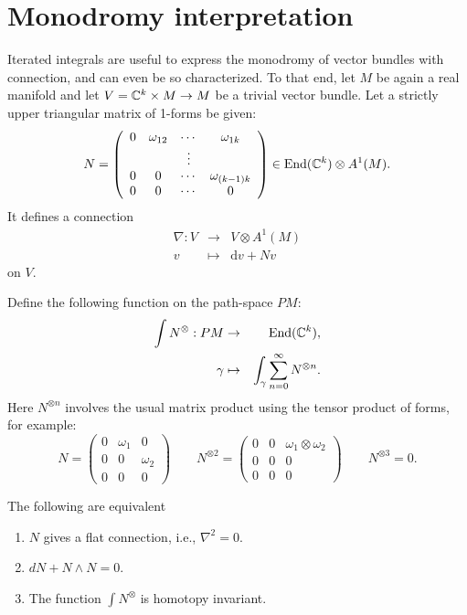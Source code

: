 \section{Monodromy interpretation}
Iterated integrals are useful to express the monodromy of vector bundles with connection, and can even be so characterized. To that end, let $M$ be again a real manifold and let $V = \mathbb{C}^k \times M \to M$ be a trivial vector bundle. Let
a strictly upper triangular matrix of 1-forms be given:
\[
N = \left(
\begin{array}{cccc}
0 & \omega_{12} & \cdots & \omega_{1k} \\
& & \vdots & \\
0 & 0 & \cdots & \omega_{(k-1)k} \\
0 & 0 & \cdots & 0
\end{array}
\right) \in \textrm{End}(\mathbb{C}^k) \otimes A^1(M).
\]
It defines a connection
\begin{eqnarray*} 
\nabla: V &\rightarrow& V \otimes A^1(M)  \\
v & \mapsto &\mathrm{d}v + Nv
\end{eqnarray*}
on $V$.


Define the following function on the path-space $PM$:
\begin{eqnarray*}
\int N^{\otimes} : PM & \to & \textrm{End}(\mathbb{C}^k), \\
\gamma & \mapsto & \int_{\gamma} \sum_{n=0}^\infty N^{\otimes n}.
\end{eqnarray*}
Here $N^{\otimes n}$ involves the usual matrix product using the tensor product of forms, for example:
\[
N = \left(
\begin{array}{ccc}
0 & \omega_1 & 0 \\
0 & 0 & \omega_2 \\
0 & 0 & 0
\end{array}
\right) \qquad
N^{\otimes 2} = \left(
\begin{array}{ccc}
0 & 0 & \omega_1 \otimes \omega_2 \\
0 & 0 & 0 \\
0 & 0 & 0
\end{array}
\right) \qquad
N^{\otimes 3} = 0.
\]

\begin{prop}\label{prop:flatconn}
The following are equivalent
\begin{enumerate}
\item $N$ gives a flat connection, i.e., $\nabla^2 = 0$.
\item $dN + N \wedge N = 0$.
\item The function $\int N^{\otimes}$ is homotopy invariant.
\end{enumerate}
\end{prop}

